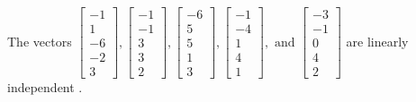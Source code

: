 \begin{exercise}
\begin{exerciseStatement}
  \end{exerciseStatement}
  \begin{exerciseAnswer}
   The vectors \(\left[\begin{array}{r}
-1 \\
1 \\
-6 \\
-2 \\
3
\end{array}\right] , \left[\begin{array}{r}
-1 \\
-1 \\
3 \\
3 \\
2
\end{array}\right] , \left[\begin{array}{r}
-6 \\
5 \\
5 \\
1 \\
3
\end{array}\right] , \left[\begin{array}{r}
-1 \\
-4 \\
1 \\
4 \\
1
\end{array}\right] , \text{ and } \left[\begin{array}{r}
-3 \\
-1 \\
0 \\
4 \\
2
\end{array}\right]\) are 
  	 linearly independent  .
  


  \end{exerciseAnswer}
\end{exercise}